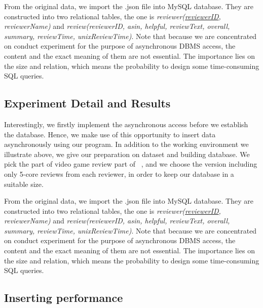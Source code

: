 \documentclass[onecolumn, conference, 12pt]{IEEEtran}
\begin{document}
	From the original data, we import the .json file into MySQL database. They are constructed into two relational tables, the one is \textit{reviewer(\underline{reviewerID}, reviewerName)} and \textit{review(reviewerID, asin, helpful, reviewText, overall, summary, reviewTime, unixReviewTime)}. Note that because we are concentrated on conduct experiment for the purpose of asynchronous DBMS access, the content and the exact meaning of them are not essential. The importance lies on the size and relation, which means the probability to design some time-consuming SQL queries.

	\subsection{Experiment Detail and Results}
	Interestingly, we firstly implement the asynchronous access before we establish the database. Hence, we make use of this opportunity to insert data asynchronously using our program. 
	In addition to the working environment we illustrate above, we give our preparation on dataset and building database. 
	We pick the part of video game review part of ~\cite{Amazon}, and we choose the version including only 5-core reviews from each reviewer, in order to keep our database in a suitable size. 
	
	From the original data, we import the .json file into MySQL database. They are constructed into two relational tables, the one is \textit{reviewer(\underline{reviewerID}, reviewerName)} and \textit{review(reviewerID, asin, helpful, reviewText, overall, summary, reviewTime, unixReviewTime)}. Note that because we are concentrated on conduct experiment for the purpose of asynchronous DBMS access, the content and the exact meaning of them are not essential. The importance lies on the size and relation, which means the probability to design some time-consuming SQL queries.
	
	
	\subsection{Inserting performance}
	
\end{document}
